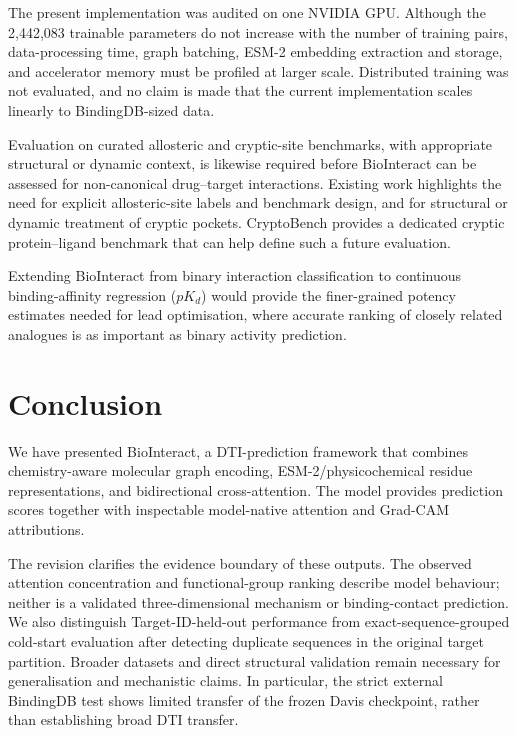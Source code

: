 \documentclass[fleqn,10pt]{wlscirep}
\begin{document}
The present implementation was audited on one NVIDIA GPU. Although the
2{,}442{,}083 trainable parameters do not increase with the number of training
pairs, data-processing time, graph batching, ESM-2 embedding extraction and
storage, and accelerator memory must be profiled at larger scale. Distributed
training was not evaluated, and no claim is made that the current implementation
scales linearly to BindingDB-sized data.

Evaluation on curated allosteric and cryptic-site benchmarks, with appropriate
structural or dynamic context, is likewise required before BioInteract can be
assessed for non-canonical drug--target interactions.  Existing work highlights
the need for explicit allosteric-site labels and benchmark design,\cite{wu2022allostericbenchmark,gatlin2026allostericgrammar}
and for structural or dynamic treatment of cryptic pockets.\cite{zhang2026crypticpockets}
CryptoBench provides a dedicated cryptic protein--ligand benchmark that can help
define such a future evaluation.\cite{skrhak2024cryptobench}

Extending BioInteract from binary interaction classification to
continuous binding-affinity regression ($pK_d$) would provide the finer-grained
potency estimates needed for lead optimisation, where accurate ranking of closely
related analogues is as important as binary activity prediction.

\section{Conclusion}
\label{sec:conclusion}

We have presented BioInteract, a DTI-prediction framework that combines
chemistry-aware molecular graph encoding, ESM-2/physicochemical residue
representations, and bidirectional cross-attention.  The model provides
prediction scores together with inspectable model-native attention and Grad-CAM
attributions.

The revision clarifies the evidence boundary of these outputs.  The observed
attention concentration and functional-group ranking describe model behaviour;
neither is a validated three-dimensional mechanism or binding-contact prediction.
We also distinguish Target-ID-held-out performance
from exact-sequence-grouped cold-start evaluation after detecting duplicate
sequences in the original target partition.  Broader datasets and direct
structural validation remain necessary for generalisation and mechanistic claims.
In particular, the strict external BindingDB test shows limited transfer of the
frozen Davis checkpoint, rather than establishing broad DTI transfer.
\end{document}
